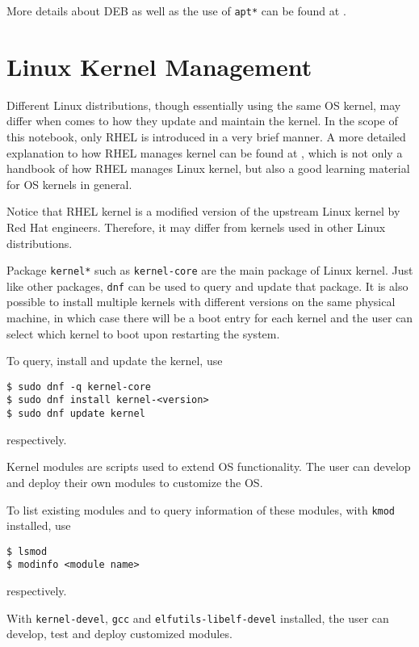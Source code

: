 More details about DEB as well as the use of \verb|apt*| can be found at \cite{debian2024debianpackagemanagement}.

\section{Linux Kernel Management}

Different Linux distributions, though essentially using the same OS kernel, may differ when comes to how they update and maintain the kernel. In the scope of this notebook, only RHEL is introduced in a very brief manner. A more detailed explanation to how RHEL manages kernel can be found at \cite{redhat2022kernel}, which is not only a handbook of how RHEL manages Linux kernel, but also a good learning material for OS kernels in general.

Notice that RHEL kernel is a modified version of the upstream Linux kernel by Red Hat engineers. Therefore, it may differ from kernels used in other Linux distributions.

Package \verb|kernel*| such as \verb|kernel-core| are the main package of Linux kernel. Just like other packages, \verb|dnf| can be used to query and update that package. It is also possible to install multiple kernels with different versions on the same physical machine, in which case there will be a boot entry for each kernel and the user can select which kernel to boot upon restarting the system.

To query, install and update the kernel, use
\begin{lstlisting}
$ sudo dnf -q kernel-core
$ sudo dnf install kernel-<version>
$ sudo dnf update kernel
\end{lstlisting}
respectively.

Kernel modules are scripts used to extend OS functionality. The user can develop and deploy their own modules to customize the OS.

To list existing modules and to query information of these modules, with \verb|kmod| installed, use
\begin{lstlisting}
$ lsmod
$ modinfo <module name>
\end{lstlisting}
respectively.

With \verb|kernel-devel|, \verb|gcc| and \verb|elfutils-libelf-devel| installed, the user can develop, test and deploy customized modules.

